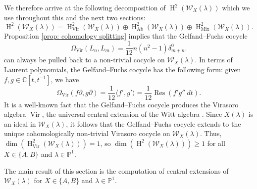 \documentclass[11pt, svgnames]{amsart}
\DeclareMathOperator{\Vir}{Vir}
\DeclareMathOperator{\Res}{Res}
\newcommand{\CC}{\mathbb{C}}
\newcommand{\PP}{\mathbb{P}}
\newcommand{\W}{\mathcal{W}}
\newcommand{\del}{\partial}
\DeclareMathOperator{\HH}{H}
\DeclareMathOperator{\Ab}{Ab}
\DeclareMathOperator{\Mix}{Mix}
\newcommand{\ang}[1]{\langle #1 \rangle}
\theoremstyle{definition}
\begin{document}
We therefore arrive at the following decomposition of $\HH^2(\W_X(\lambda))$ which we use throughout this and the next two sections:
\begin{equation}\label{eq: H^2 vector space splitting}
  \HH^2(\W_X(\lambda)) = \HH_{\Vir}^2(\W_X(\lambda)) \oplus \HH_{\Ab}^2(\W_X(\lambda)) \oplus \HH_{\Mix}^2(\W_X(\lambda)).  
\end{equation}
Proposition \ref{prop: cohomology splitting} implies that the Gelfand--Fuchs cocycle
\begin{equation}\label{eq:Virasoro cocycle}
    \Omega_{\Vir} (L_n, L_m) = \frac{1}{12}n(n^2-1)\delta^0_{m+n}.
\end{equation}
can always be pulled back to a non-trivial cocycle on $\W_X(\lambda)$. In terms of Laurent polynomials, the Gelfand--Fuchs cocycle has the following form: given $f,g \in \CC[t,t^{-1}]$, we have
$$\Omega_{\Vir}(f\del,g\del) = \frac{1}{12}\ang{f',g'} = \frac{1}{12}\Res(f'g'' \ dt).$$
It is a well-known fact that the Gelfand--Fuchs cocycle produces the Virasoro algebra $\Vir$, the universal central extension of the Witt algebra \cite{Schottenloher}. Since $X(\lambda)$ is an ideal in $\W_X(\lambda)$, it follows that the Gelfand--Fuchs cocycle extends to the unique cohomologically non-trivial Virasoro cocycle on $\W_X(\lambda)$. Thus, $\dim(\HH_{\Vir}^2(\W_X(\lambda))) = 1$, so $\dim(\HH^2 (\W_X(\lambda))) \geq 1$ for all $X \in \{A,B\}$ and $\lambda\in\PP^1$.

The main result of this section is the computation of central extensions of $\W_X(\lambda)$ for $X \in \{A,B\}$ and $\lambda \in \PP^1$.
\end{document}
